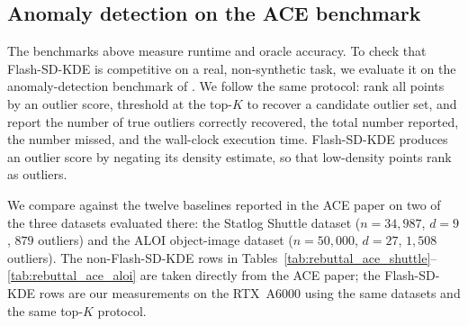 \subsection{Anomaly detection on the ACE benchmark}
\label{app:ace}

The benchmarks above measure runtime and oracle accuracy.
To check that Flash-SD-KDE is competitive on a real, non-synthetic task, we
evaluate it on the anomaly-detection benchmark of \citet{luo2018ace}.
We follow the same protocol: rank all points by an outlier score, threshold
at the top-$K$ to recover a candidate outlier set, and report the number of
true outliers correctly recovered, the total number reported, the number
missed, and the wall-clock execution time.
Flash-SD-KDE produces an outlier score by negating its density estimate, so
that low-density points rank as outliers.

We compare against the twelve baselines reported in the ACE paper on two
of the three datasets evaluated there: the Statlog Shuttle dataset
($n=34{,}987$, $d=9$, $879$ outliers) and the ALOI object-image dataset
($n=50{,}000$, $d=27$, $1{,}508$ outliers).
The non-Flash-SD-KDE rows in
Tables~\ref{tab:rebuttal_ace_shuttle}--\ref{tab:rebuttal_ace_aloi} are taken
directly from the ACE paper; the Flash-SD-KDE rows are our measurements on
the RTX~A6000 using the same datasets and the same top-$K$ protocol.

